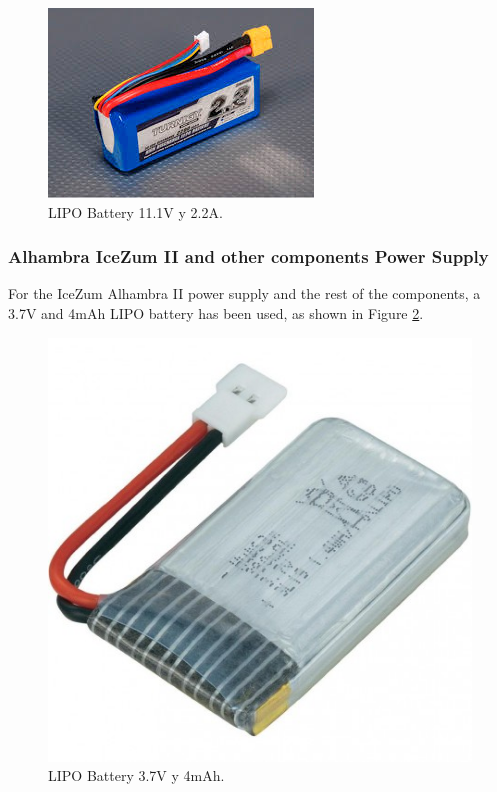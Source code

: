 \begin{center}
	\begin{figure}[H]
		\center
		\includegraphics[scale=0.8]{imagenes/Balancing_Robot/LIPO111}
		\caption{LIPO Battery 11.1V y 2.2A. }
		\label{fig:lipo111}
	\end{figure}
\end{center}

\subsubsection{Alhambra IceZum II and other components Power Supply}

For the IceZum Alhambra II power supply and the rest of the components, a 3.7V and 4mAh LIPO battery has been used, as shown in Figure \ref{fig:lipo37}. 
\begin{center}
	\begin{figure}[H]
		\center
		\includegraphics[scale=0.5]{imagenes/Balancing_Robot/LIPO37}
		\caption{LIPO Battery 3.7V y 4mAh.}
		\label{fig:lipo37}
	\end{figure}
\end{center}
\newpage
